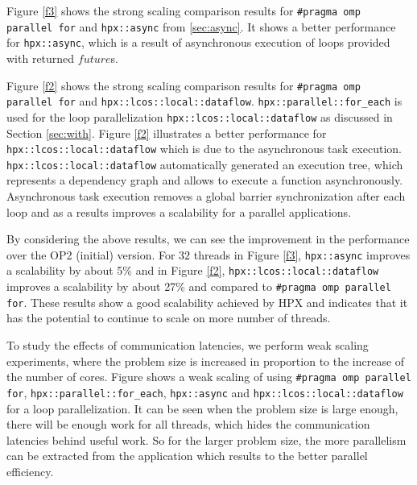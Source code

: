 \documentclass[conference]{IEEEtran}
\begin{document}
Figure \ref{f3} shows the strong scaling comparison results for \texttt{\#pragma omp parallel for} and \texttt{hpx::async} from \ref{sec:async}. It shows a better performance for \texttt{hpx::async}, which is a result of asynchronous execution of loops provided with returned $future$s.


Figure \ref{f2} shows the strong scaling comparison results for \texttt{\#pragma omp parallel for} and \texttt{hpx::lcos::local::dataflow}. \texttt{hpx::parallel::for\_each} is used for the loop parallelization \texttt{hpx::lcos::local::dataflow} as discussed in Section \ref{sec:with}. Figure \ref{f2} illustrates a better performance for \texttt{hpx::lcos::local::dataflow} which is due to the asynchronous task execution. \texttt{hpx::lcos::local::dataflow} automatically generated an execution tree, which represents a dependency graph and allows to execute a function asynchronously. Asynchronous task execution removes a global barrier synchronization after each loop and as a results improves a scalability for a parallel applications.    

By considering the above results, we can see the improvement in the performance over the OP2 (initial) version. For $32$ threads in Figure \ref{f3}, \texttt{hpx::async} improves a scalability by about 5\% and in Figure \ref{f2}, \texttt{hpx::lcos::local::dataflow} improves a scalability by about 27\% and compared to \texttt{\#pragma omp parallel for}. These results show a good scalability achieved by HPX and indicates that it has the potential to continue to scale on more number of threads.

To study the effects of communication latencies, we perform weak scaling experiments, where the problem size is increased in proportion to the increase of the number of cores. Figure shows a weak scaling of using \texttt{\#pragma omp parallel for}, \texttt{hpx::parallel::for\_each}, \texttt{hpx::async} and \texttt{hpx::lcos::local::dataflow} for a loop parallelization. It can be seen when the problem size is large enough, there will be enough work for all threads, which hides the communication latencies behind useful work. So for the larger problem size, the more parallelism can be extracted from the application which results to the better parallel efficiency. 
\end{document}
